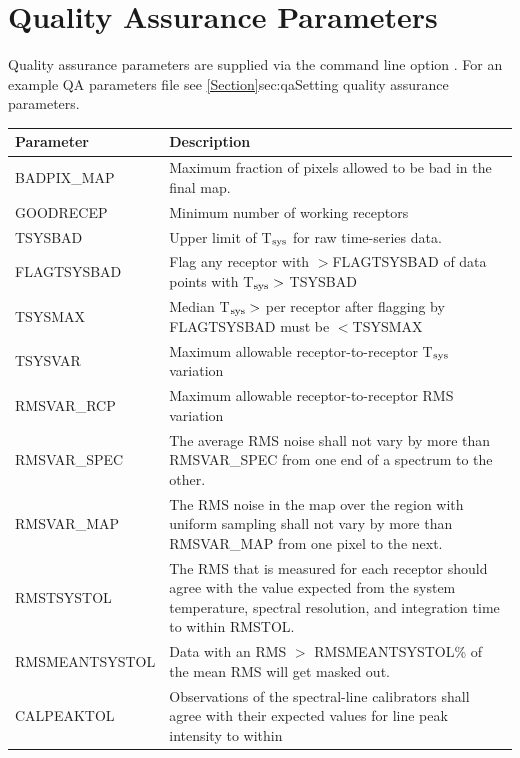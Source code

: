 \documentclass[11pt,oneside,chapters]{starlink}
\begin{document}
\chapter{Quality Assurance Parameters}
\label{app:qa}
Quality assurance parameters are supplied via the command line option
. For an example QA parameters file see
\cref{Section}{sec:qa}{Setting quality assurance parameters}.
\begin{table}[h!]
\begin{tabular}{|p{4.0cm}|p{11.0cm}|}
\hline
\textbf{Parameter} & \textbf{Description} \\
\hline
BADPIX\_MAP    & Maximum fraction of pixels allowed to be bad in the final map. \\
GOODRECEP      & Minimum number of working receptors \\
TSYSBAD        & Upper limit of T$_{\textnormal{sys}}$ for raw time-series data.\\
FLAGTSYSBAD    & Flag any receptor with $>$FLAGTSYSBAD of data points with
                 T$_{\textnormal{sys}}>$ TSYSBAD \\
TSYSMAX        & Median T$_{\textnormal{sys}}>$ per receptor after flagging by FLAGTSYSBAD
                 must be $<$TSYSMAX \\
TSYSVAR        & Maximum allowable receptor-to-receptor T$_{\textnormal{sys}}$ variation \\
RMSVAR\_RCP    & Maximum allowable receptor-to-receptor RMS variation \\
RMSVAR\_SPEC   & The average RMS noise shall not vary by more than RMSVAR\_SPEC
                 from one end of a spectrum to the other. \\
RMSVAR\_MAP    & The RMS noise in the map over the region with uniform sampling
                 shall not vary by more than RMSVAR\_MAP from one pixel to the
                 next. \\
RMSTSYSTOL     & The RMS that is measured for each receptor should agree with the
                 value expected from the system temperature, spectral resolution,
                 and integration time to within RMSTOL. \\
RMSMEANTSYSTOL & Data with an RMS $>$ RMSMEANTSYSTOL\% of the mean RMS will get
                 masked out. \\
CALPEAKTOL     & Observations of the spectral-line calibrators shall agree with
                 their expected values for line peak intensity to within

\end{tabular}
\end{table}
\end{document}

